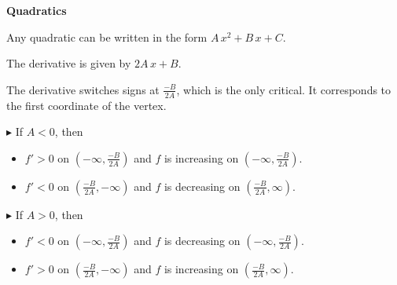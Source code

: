 \documentclass{ximera}
\begin{document}
\textbf{Quadratics}



Any quadratic can be written in the form $A \, x^2 + B \, x + C$. 

The derivative is given by $2A \, x + B$.


The derivative switches signs at $\frac{-B}{2A}$, which is the only critical. It corresponds to the first coordinate of the vertex. 



\textbf{$\blacktriangleright$} If $A < 0$, then 

\begin{itemize}
\item $f' > 0$ on $\left( -\infty, \frac{-B}{2A} \right)$ and $f$ is increasing on $\left( -\infty, \frac{-B}{2A} \right)$. \\
\item $f' < 0$ on $\left( \frac{-B}{2A}, -\infty \right)$ and $f$ is decreasing on $\left( \frac{-B}{2A}, \infty \right)$. 
\end{itemize}







\textbf{$\blacktriangleright$} If $A > 0$, then 

\begin{itemize}
\item $f' < 0$ on $\left( -\infty, \frac{-B}{2A} \right)$ and $f$ is decreasing on $\left( -\infty, \frac{-B}{2A} \right)$. \\
\item $f' > 0$ on $\left( \frac{-B}{2A}, -\infty \right)$ and $f$ is increasing on $\left( \frac{-B}{2A}, \infty \right)$. 
\end{itemize}
\end{document}
